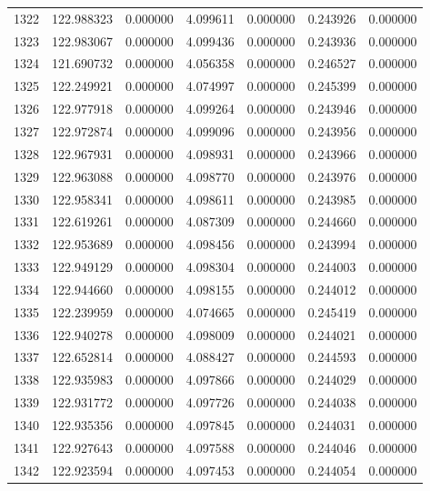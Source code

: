 \begin{tabular}{rrrrrrr}
1322 & 122.988323 &    0.000000 &  4.099611 &    0.000000 &    0.243926 &  0.000000 \\
1323 & 122.983067 &    0.000000 &  4.099436 &    0.000000 &    0.243936 &  0.000000 \\
1324 & 121.690732 &    0.000000 &  4.056358 &    0.000000 &    0.246527 &  0.000000 \\
1325 & 122.249921 &    0.000000 &  4.074997 &    0.000000 &    0.245399 &  0.000000 \\
1326 & 122.977918 &    0.000000 &  4.099264 &    0.000000 &    0.243946 &  0.000000 \\
1327 & 122.972874 &    0.000000 &  4.099096 &    0.000000 &    0.243956 &  0.000000 \\
1328 & 122.967931 &    0.000000 &  4.098931 &    0.000000 &    0.243966 &  0.000000 \\
1329 & 122.963088 &    0.000000 &  4.098770 &    0.000000 &    0.243976 &  0.000000 \\
1330 & 122.958341 &    0.000000 &  4.098611 &    0.000000 &    0.243985 &  0.000000 \\
1331 & 122.619261 &    0.000000 &  4.087309 &    0.000000 &    0.244660 &  0.000000 \\
1332 & 122.953689 &    0.000000 &  4.098456 &    0.000000 &    0.243994 &  0.000000 \\
1333 & 122.949129 &    0.000000 &  4.098304 &    0.000000 &    0.244003 &  0.000000 \\
1334 & 122.944660 &    0.000000 &  4.098155 &    0.000000 &    0.244012 &  0.000000 \\
1335 & 122.239959 &    0.000000 &  4.074665 &    0.000000 &    0.245419 &  0.000000 \\
1336 & 122.940278 &    0.000000 &  4.098009 &    0.000000 &    0.244021 &  0.000000 \\
1337 & 122.652814 &    0.000000 &  4.088427 &    0.000000 &    0.244593 &  0.000000 \\
1338 & 122.935983 &    0.000000 &  4.097866 &    0.000000 &    0.244029 &  0.000000 \\
1339 & 122.931772 &    0.000000 &  4.097726 &    0.000000 &    0.244038 &  0.000000 \\
1340 & 122.935356 &    0.000000 &  4.097845 &    0.000000 &    0.244031 &  0.000000 \\
1341 & 122.927643 &    0.000000 &  4.097588 &    0.000000 &    0.244046 &  0.000000 \\
1342 & 122.923594 &    0.000000 &  4.097453 &    0.000000 &    0.244054 &  0.000000 \\

\end{tabular}
